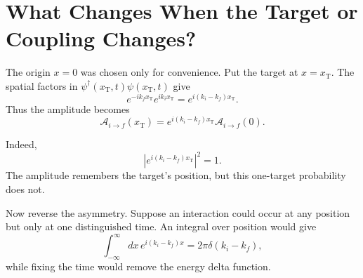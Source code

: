 \section{What Changes When the Target or Coupling Changes?}

The origin \(x=0\) was chosen only for convenience. Put the target at \(x=x_{\mathrm T}\). The spatial factors in \(\psi^\dagger(x_{\mathrm T},t)\psi(x_{\mathrm T},t)\) give
\begin{equation}
e^{-ik_f x_{\mathrm T}}e^{ik_i x_{\mathrm T}}
=e^{i(k_i-k_f)x_{\mathrm T}}.
\end{equation}
Thus the amplitude becomes
\begin{equation}
\mathcal A_{i\to f}(x_{\mathrm T})
=e^{i(k_i-k_f)x_{\mathrm T}}
\mathcal A_{i\to f}(0).
\end{equation}

\begin{classroomqa}
\end{classroomqa}

Indeed,
\begin{equation}
\left|e^{i(k_i-k_f)x_{\mathrm T}}\right|^2=1.
\end{equation}
The amplitude remembers the target's position, but this one-target probability does not.

Now reverse the asymmetry. Suppose an interaction could occur at any position but only at one distinguished time. An integral over position would give
\begin{equation}
\int_{-\infty}^{\infty}dx\,
e^{i(k_i-k_f)x}
=2\pi\delta(k_i-k_f),
\end{equation}
while fixing the time would remove the energy delta function.

\begin{classroomqa}
\end{classroomqa}

